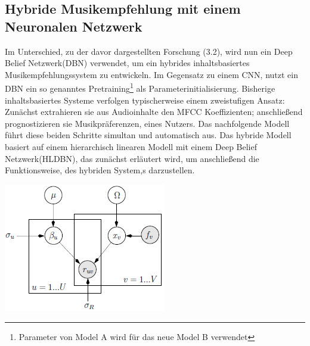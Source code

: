 \documentclass[twosided,a4,10pt]{article}
\begin{document}
\begin{multicols}{2}
		\subsection{Hybride Musikempfehlung mit einem Neuronalen Netzwerk}
		Im Unterschied, zu der davor dargestellten Forschung (3.2), wird nun ein Deep Belief Netzwerk(DBN) verwendet, um ein hybrides inhaltsbasiertes Musikempfehlungssystem zu entwickeln. Im Gegensatz zu einem CNN, nutzt ein DBN ein so genanntes Pretraining\footnote[14]{Parameter von Model A wird für das neue Model B verwendet} als Parameterinitialisierung. Bisherige inhaltsbasiertes Systeme verfolgen typischerweise einem zweistufigen Ansatz: Zunächst extrahieren sie aus Audioinhalte den MFCC Koeffizienten; anschließend prognostizieren sie Musikpräferenzen, eines Nutzers. Das nachfolgende Modell führt diese beiden Schritte simultan und automatisch aus. \cite{wang}\newline
		Das hybride Modell basiert auf einem hierarchisch linearen Modell mit einem Deep Belief Netzwerk(HLDBN), das zunächst erläutert wird, um anschließend die Funktionsweise, des hybriden System,s darzustellen.
		\begin{minipage}{0.45\textwidth}
			\centering
			\includegraphics{img/hlmdbn.png}
			\label{img:hlmdbn}
		\end{minipage}

\end{multicols}
\end{document}
